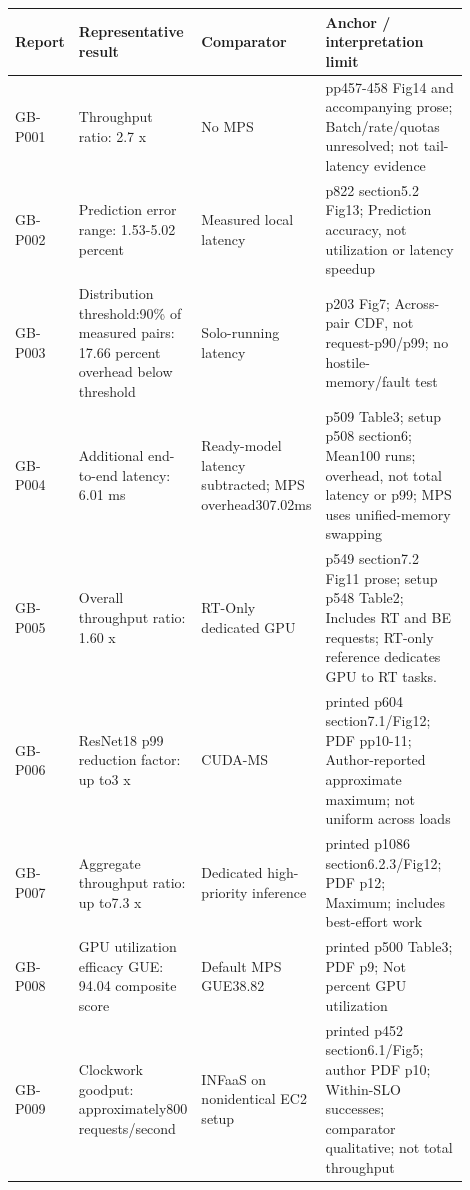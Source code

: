 {\small\begin{longtable}{>{\raggedright\arraybackslash}p{0.1\linewidth}>{\raggedright\arraybackslash}p{0.24\linewidth}>{\raggedright\arraybackslash}p{0.23\linewidth}>{\raggedright\arraybackslash}p{0.33\linewidth}}
\toprule
Report & Representative result & Comparator & Anchor /\allowbreak{} interpretation limit\\\midrule
\endhead
GB-P001 & Throughput ratio:\allowbreak{} 2.7 x & No MPS & pp457-458 Fig14 and accompanying prose; Batch/\allowbreak{}rate/\allowbreak{}quotas unresolved; not tail-latency evidence\\
GB-P002 & Prediction error range:\allowbreak{} 1.53-5.02 percent & Measured local latency & p822 section5.2 Fig13; Prediction accuracy, not utilization or latency speedup\\
GB-P003 & Distribution threshold:\allowbreak{}90\% of measured pairs:\allowbreak{} 17.66 percent overhead below threshold & Solo-running latency & p203 Fig7; Across-pair CDF, not request-p90/\allowbreak{}p99; no hostile-memory/\allowbreak{}fault test\\
GB-P004 & Additional end-to-end latency:\allowbreak{} 6.01 ms & Ready-model latency subtracted; MPS overhead307.02ms & p509 Table3; setup p508 section6; Mean100 runs; overhead, not total latency or p99; MPS uses unified-memory swapping\\
GB-P005 & Overall throughput ratio:\allowbreak{} 1.60 x & RT-Only dedicated GPU & p549 section7.2 Fig11 prose; setup p548 Table2; Includes RT and BE requests; RT-only reference dedicates GPU to RT tasks.\\
GB-P006 & ResNet18 p99 reduction factor:\allowbreak{} up to3 x & CUDA-MS & printed p604 section7.1/\allowbreak{}Fig12; PDF pp10-11; Author-reported approximate maximum; not uniform across loads\\
GB-P007 & Aggregate throughput ratio:\allowbreak{} up to7.3 x & Dedicated high-priority inference & printed p1086 section6.2.3/\allowbreak{}Fig12; PDF p12; Maximum; includes best-effort work\\
GB-P008 & GPU utilization efficacy GUE:\allowbreak{} 94.04 composite score & Default MPS GUE38.82 & printed p500 Table3; PDF p9; Not percent GPU utilization\\
GB-P009 & Clockwork goodput:\allowbreak{} approximately800 requests/\allowbreak{}second & INFaaS on nonidentical EC2 setup & printed p452 section6.1/\allowbreak{}Fig5; author PDF p10; Within-SLO successes; comparator qualitative; not total throughput\\

\end{longtable}}
